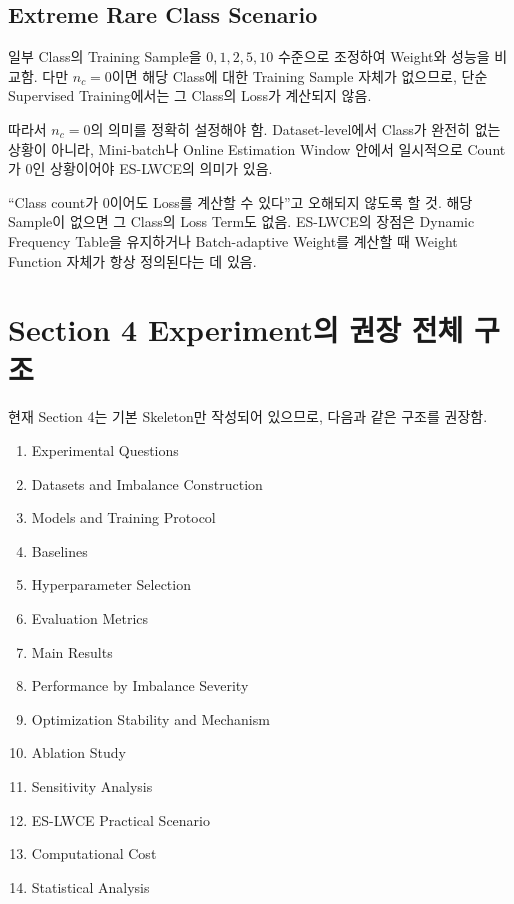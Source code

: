 \documentclass[11pt,a4paper]{article}
\begin{document}
\subsection{Extreme Rare Class Scenario}

일부 Class의 Training Sample을 \(0,1,2,5,10\) 수준으로 조정하여 Weight와 성능을 비교함. 다만 \(n_c=0\)이면 해당 Class에 대한 Training Sample 자체가 없으므로, 단순 Supervised Training에서는 그 Class의 Loss가 계산되지 않음.

따라서 \(n_c=0\)의 의미를 정확히 설정해야 함. Dataset-level에서 Class가 완전히 없는 상황이 아니라, Mini-batch나 Online Estimation Window 안에서 일시적으로 Count가 \(0\)인 상황이어야 ES-LWCE의 의미가 있음.

\begin{tcolorbox}[title=중요]
``Class count가 0이어도 Loss를 계산할 수 있다''고 오해되지 않도록 할 것. 해당 Sample이 없으면 그 Class의 Loss Term도 없음. ES-LWCE의 장점은 Dynamic Frequency Table을 유지하거나 Batch-adaptive Weight를 계산할 때 Weight Function 자체가 항상 정의된다는 데 있음.
\end{tcolorbox}

\section{Section 4 Experiment의 권장 전체 구조}

현재 Section 4는 기본 Skeleton만 작성되어 있으므로, 다음과 같은 구조를 권장함.

\begin{enumerate}
\item Experimental Questions
\item Datasets and Imbalance Construction
\item Models and Training Protocol
\item Baselines
\item Hyperparameter Selection
\item Evaluation Metrics
\item Main Results
\item Performance by Imbalance Severity
\item Optimization Stability and Mechanism
\item Ablation Study
\item Sensitivity Analysis
\item ES-LWCE Practical Scenario
\item Computational Cost
\item Statistical Analysis
\end{enumerate}
\end{document}
